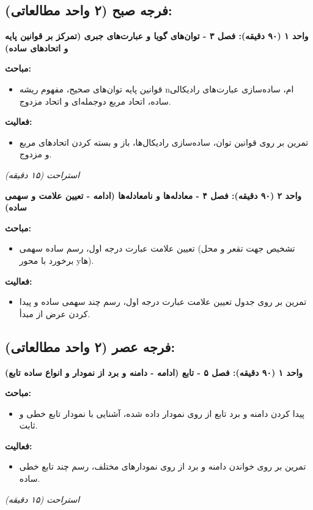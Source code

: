 \documentclass[12pt,a4paper]{article}
\newcommand{\studyunit}[1]{\par\medskip\noindent\textbf{#1}\par\nopagebreak}
\newcommand{\topics}{\par\medskip\noindent\textbf{مباحث:}\begin{itemize}[nosep,after=\vspace{-0.5\baselineskip}]}
\newcommand{\activities}{\par\medskip\noindent\textbf{فعالیت:}\begin{itemize}[nosep,after=\vspace{-0.5\baselineskip}]}
\newcommand{\breaktime}[1]{\par\smallskip\centerline{\textit{#1}}\smallskip}
\begin{document}
\subsection*{فرجه صبح (۲ واحد مطالعاتی):}
    \studyunit{واحد ۱ (۹۰ دقیقه): فصل ۳ - توان‌های گویا و عبارت‌های جبری (تمرکز بر قوانین پایه و اتحادهای ساده)}
        \topics
            \item قوانین پایه توان‌های صحیح، مفهوم ریشه nام، ساده‌سازی عبارت‌های رادیکالی ساده، اتحاد مربع دوجمله‌ای و اتحاد مزدوج.
        \end{itemize}
        \activities
            \item تمرین بر روی قوانین توان، ساده‌سازی رادیکال‌ها، باز و بسته کردن اتحادهای مربع و مزدوج.
        \end{itemize}

    \breaktime{استراحت (۱۵ دقیقه)}

    \studyunit{واحد ۲ (۹۰ دقیقه): فصل ۴ - معادله‌ها و نامعادله‌ها (ادامه - تعیین علامت و سهمی ساده)}
        \topics
            \item تعیین علامت عبارت درجه اول، رسم ساده سهمی (تشخیص جهت تقعر و محل برخورد با محور yها).
        \end{itemize}
        \activities
            \item تمرین بر روی جدول تعیین علامت عبارت درجه اول، رسم چند سهمی ساده و پیدا کردن عرض از مبدأ.
        \end{itemize}

\subsection*{فرجه عصر (۲ واحد مطالعاتی):}
    \studyunit{واحد ۱ (۹۰ دقیقه): فصل ۵ - تابع (ادامه - دامنه و برد از نمودار و انواع ساده تابع)}
        \topics
            \item پیدا کردن دامنه و برد تابع از روی نمودار داده شده، آشنایی با نمودار تابع خطی و ثابت.
        \end{itemize}
        \activities
            \item تمرین بر روی خواندن دامنه و برد از روی نمودارهای مختلف، رسم چند تابع خطی ساده.
        \end{itemize}

    \breaktime{استراحت (۱۵ دقیقه)}
\end{document}
